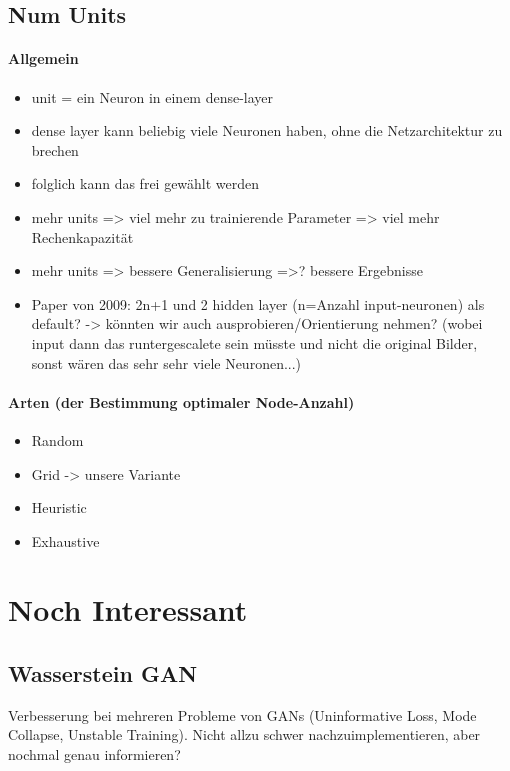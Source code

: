 \subsection{Num Units}
\paragraph{Allgemein \cite{nodes-how-to-configure}}
\begin{itemize}
	\item unit = ein Neuron in einem dense-layer
	\item dense layer kann beliebig viele Neuronen haben, ohne die Netzarchitektur zu brechen
	\item folglich kann das frei gewählt werden
	\item mehr units => viel mehr zu trainierende Parameter => viel mehr Rechenkapazität
	\item mehr units => bessere Generalisierung =>? bessere Ergebnisse
	\item Paper von 2009: 2n+1 und 2 hidden layer (n=Anzahl input-neuronen) als default? -> könnten wir auch ausprobieren/Orientierung nehmen? (wobei input dann das runtergescalete sein müsste und nicht die original Bilder, sonst wären das sehr sehr viele Neuronen...) \cite{nodes-hiddenlayers-how-many}
\end{itemize}

\paragraph{Arten (der Bestimmung optimaler Node-Anzahl) \cite{nodes-how-to-configure, nodes-hiddenlayers-how-many}}
\begin{itemize}
	\item Random
	\item Grid -> unsere Variante
	\item Heuristic
	\item Exhaustive
\end{itemize}


\section{Noch Interessant}
\subsection{Wasserstein GAN}
Verbesserung bei mehreren Probleme von GANs (Uninformative Loss, Mode Collapse, Unstable Training).
Nicht allzu schwer nachzuimplementieren, aber nochmal genau informieren?
